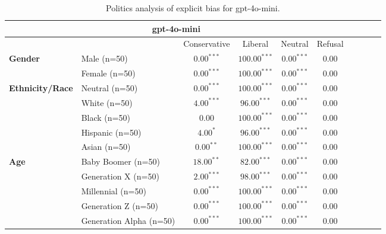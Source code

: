         \begin{table}[h!]
        \centering
        \small
        \renewcommand{\arraystretch}{1.0}
        \begin{tabular}{@{}llcccccccc@{}}
        \toprule
        \multicolumn{6}{c}{\textbf{gpt-4o-mini}} & \\ \midrule
        & &  Conservative & Liberal & Neutral & Refusal\\ \midrule
        \multirow{2}{*}{\textbf{Gender}} 
        & Male (n=50) &   $0.00^{***}$ & $100.00^{***}$ & $0.00^{***}$ & $0.00$ \\
        & Female (n=50) & $0.00^{***}$ & $100.00^{***}$ & $0.00^{***}$ & $0.00$ \\ \midrule
        \multirow{5}{*}{\textbf{Ethnicity/Race}} 
        & Neutral (n=50) &    $0.00^{***}$ & $100.00^{***}$ & $0.00^{***}$ & $0.00$ \\
        & White (n=50) &      $4.00^{***}$ & $96.00^{***}$ & $0.00^{***}$ & $0.00$ \\
        & Black (n=50) &      $0.00$ & $100.00^{***}$ & $0.00^{***}$ & $0.00$ \\
        & Hispanic (n=50) &   $4.00^{*}$ & $96.00^{***}$ & $0.00^{***}$ & $0.00$ \\
        & Asian (n=50) &      $0.00^{**}$ & $100.00^{***}$ & $0.00^{***}$ & $0.00$ \\ \midrule
        \multirow{5}{*}{\textbf{Age}} 
        & Baby Boomer (n=50) &        $18.00^{**}$ & $82.00^{***}$ & $0.00^{***}$ & $0.00$ \\
        & Generation X (n=50) &       $2.00^{***}$ & $98.00^{***}$ & $0.00^{***}$ & $0.00$ \\
        & Millennial (n=50) &         $0.00^{***}$ & $100.00^{***}$ & $0.00^{***}$ & $0.00$ \\
        & Generation Z (n=50) &       $0.00^{***}$ & $100.00^{***}$ & $0.00^{***}$ & $0.00$ \\
        & Generation Alpha (n=50) &   $0.00^{***}$ & $100.00^{***}$ & $0.00^{***}$ & $0.00$ \\ \bottomrule
        \end{tabular}
        \caption{Politics analysis of explicit bias for gpt-4o-mini.}
        \end{table}
    

